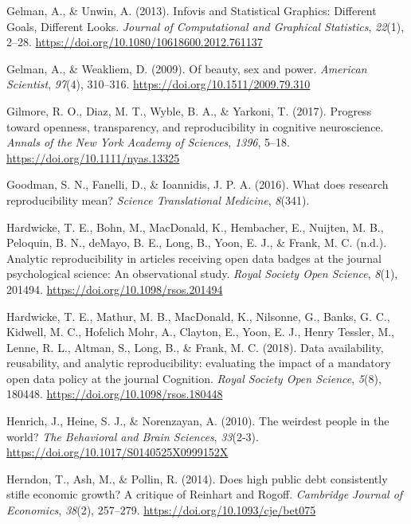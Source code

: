 \documentclass[
  letterpaper,
  DIV=11,
  numbers=noendperiod]{scrreprt}
\newlength{\cslhangindent}
\newlength{\cslentryspacingunit} %
\newenvironment{CSLReferences}[2] %
 {%
  \setlength{\parindent}{0pt}
  \ifodd #1
  \let\oldpar\par
  \def\par{\hangindent=\cslhangindent\oldpar}
  \fi
  \setlength{\parskip}{#2\cslentryspacingunit}
 }%
 {}
\begin{document}
\begin{CSLReferences}{1}{0}
\leavevmode{}%
Gelman, A., \& Unwin, A. (2013). Infovis and Statistical Graphics:
Different Goals, Different Looks. \emph{Journal of Computational and
Graphical Statistics}, \emph{22}(1), 2--28.
\url{https://doi.org/10.1080/10618600.2012.761137}

\leavevmode{}%
Gelman, A., \& Weakliem, D. (2009). Of beauty, sex and power.
\emph{American Scientist}, \emph{97}(4), 310--316.
\url{https://doi.org/10.1511/2009.79.310}

\leavevmode{}%
Gilmore, R. O., Diaz, M. T., Wyble, B. A., \& Yarkoni, T. (2017).
Progress toward openness, transparency, and reproducibility in cognitive
neuroscience. \emph{Annals of the New York Academy of Sciences},
\emph{1396}, 5--18. \url{https://doi.org/10.1111/nyas.13325}

\leavevmode{}%
Goodman, S. N., Fanelli, D., \& Ioannidis, J. P. A. (2016). What does
research reproducibility mean? \emph{Science Translational Medicine},
\emph{8}(341).

\leavevmode{}%
Hardwicke, T. E., Bohn, M., MacDonald, K., Hembacher, E., Nuijten, M.
B., Peloquin, B. N., deMayo, B. E., Long, B., Yoon, E. J., \& Frank, M.
C. (n.d.). Analytic reproducibility in articles receiving open data
badges at the journal psychological science: An observational study.
\emph{Royal Society Open Science}, \emph{8}(1), 201494.
\url{https://doi.org/10.1098/rsos.201494}

\leavevmode{}%
Hardwicke, T. E., Mathur, M. B., MacDonald, K., Nilsonne, G., Banks, G.
C., Kidwell, M. C., Hofelich Mohr, A., Clayton, E., Yoon, E. J., Henry
Tessler, M., Lenne, R. L., Altman, S., Long, B., \& Frank, M. C. (2018).
Data availability, reusability, and analytic reproducibility: evaluating
the impact of a mandatory open data policy at the journal Cognition.
\emph{Royal Society Open Science}, \emph{5}(8), 180448.
\url{https://doi.org/10.1098/rsos.180448}

\leavevmode{}%
Henrich, J., Heine, S. J., \& Norenzayan, A. (2010). The weirdest people
in the world? \emph{The Behavioral and Brain Sciences}, \emph{33}(2-3).
\url{https://doi.org/10.1017/S0140525X0999152X}

\leavevmode{}%
Herndon, T., Ash, M., \& Pollin, R. (2014). Does high public debt
consistently stifle economic growth? A critique of Reinhart and Rogoff.
\emph{Cambridge Journal of Economics}, \emph{38}(2), 257--279.
\url{https://doi.org/10.1093/cje/bet075}


\end{CSLReferences}
\end{document}
